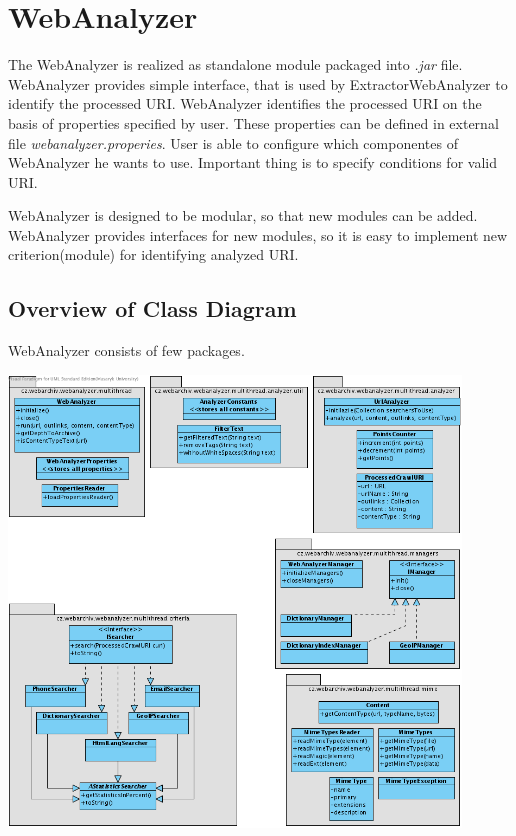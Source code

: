 \documentclass[11pt,a4paper]{article}
\begin{document}

\newpage
\section{WebAnalyzer}

The WebAnalyzer is realized as standalone module packaged into \emph{.jar} file. WebAnalyzer provides simple interface, that is used by ExtractorWebAnalyzer to identify the processed URI. WebAnalyzer identifies the processed URI on the basis of properties specified by user. These properties can be defined in external file \emph{webanalyzer.properies}. User is able to configure which componentes of WebAnalyzer he wants to use. Important thing is to specify conditions for valid URI.

WebAnalyzer is designed to be modular, so that new modules can be added. WebAnalyzer provides interfaces for new modules, so it is easy to implement new criterion(module) for identifying analyzed URI.

\subsection{Overview of Class Diagram}

WebAnalyzer consists of few packages.

\begin{center}
\includegraphics[width=120mm]{webanalyzerCD.png}
\end{center}
\end{document}
